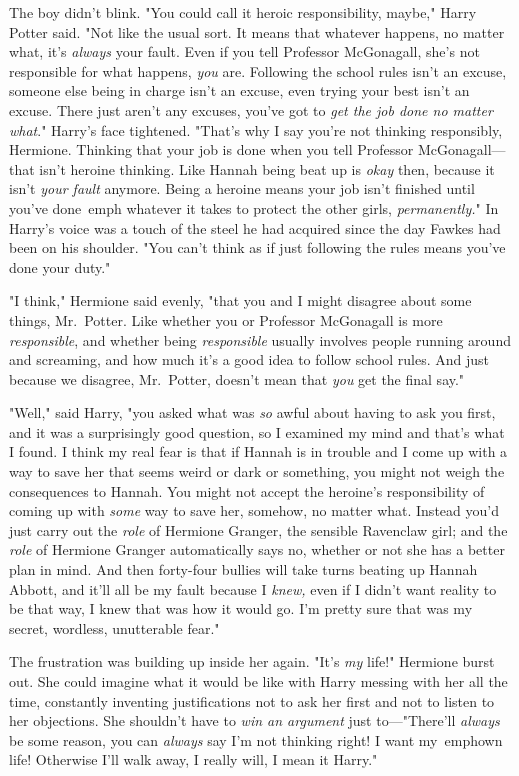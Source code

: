 The boy didn't blink. "You could call it heroic responsibility, maybe," Harry 
Potter said. "Not like the usual sort. It means that whatever happens, no 
matter what, it's \emph{always} your fault. Even if you tell Professor 
McGonagall, she's not responsible for what happens, \emph{you} are. Following 
the school rules isn't an excuse, someone else being in charge isn't an excuse, 
even trying your best isn't an excuse. There just aren't any excuses, you've 
got to \emph{get the job done no matter what}." Harry's face tightened. "That's 
why I say you're not thinking responsibly, Hermione. Thinking that your job is 
done when you tell Professor McGonagall---that isn't heroine thinking. Like 
Hannah being beat up is \emph{okay} then, because it isn't \emph{your fault} 
anymore. Being a heroine means your job isn't finished until you've done\ emph{
whatever it takes} to protect the other girls, \emph{permanently.}" In Harry's 
voice was a touch of the steel he had acquired since the day Fawkes had been on 
his shoulder. "You can't think as if just following the rules means you've done 
your duty."

"I think," Hermione said evenly, "that you and I might disagree about some 
things, Mr.~Potter. Like whether you or Professor McGonagall is more 
\emph{responsible}, and whether being \emph{responsible} usually involves 
people running around and screaming, and how much it's a good idea to follow 
school rules. And just because we disagree, Mr.~Potter, doesn't mean that 
\emph{you} get the final say."

"Well," said Harry, "you asked what was \emph{so} awful about having to ask you 
first, and it was a surprisingly good question, so I examined my mind and 
that's what I found. I think my real fear is that if Hannah is in trouble and I 
come up with a way to save her that seems weird or dark or something, you might 
not weigh the consequences to Hannah. You might not accept the heroine's 
responsibility of coming up with \emph{some} way to save her, somehow, no 
matter what. Instead you'd just carry out the \emph{role} of Hermione Granger, 
the sensible Ravenclaw girl; and the \emph{role} of Hermione Granger 
automatically says no, whether or not she has a better plan in mind. And then 
forty-four bullies will take turns beating up Hannah Abbott, and it'll all be 
my fault because I \emph{knew,} even if I didn't want reality to be that way, I 
knew that was how it would go. I'm pretty sure that was my secret, wordless, 
unutterable fear."

The frustration was building up inside her again. "It's \emph{my} life!" 
Hermione burst out. She could imagine what it would be like with Harry messing 
with her all the time, constantly inventing justifications not to ask her first 
and not to listen to her objections. She shouldn't have to \emph{win an 
argument} just to---"There'll \emph{always} be some reason, you can 
\emph{always} say I'm not thinking right! I want my\ emph{own life!} Otherwise 
I'll walk away, I really will, I mean it Harry."

